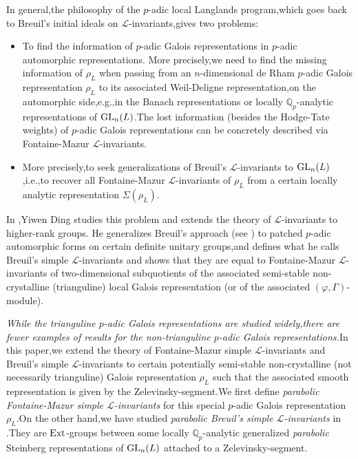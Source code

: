 \documentclass[SecEq,CM,GP]{degruyter-crelle} %
\theoremstyle{plain}
\newcommand{\ext}{{\rm Ext}}
\newcommand{\GLN}{{\rm GL}}
\newcommand{\BQ}{{\mathbb{Q}}}
\newcommand{\sL}{\mathcal L}
\begin{document}
In general,\;the philosophy of the $p$-adic local Langlands program,\;which goes back to Breuil's initial ideals on $\sL$-invariants,\;gives two problems:
\begin{itemize}
	\item[(I)] To find the information of $p$-adic Galois representations in $p$-adic automorphic representations. More precisely,\;we need to find the missing information  of $\rho_L$  when passing from an $n$-dimensional de Rham $p$-adic Galois representation $\rho_L$ to its associated Weil-Deligne representation,\;on the automorphic side,\;e.g.,\;in the Banach representations or locally ${\BQ}_p$-analytic  representations of $\GLN_n(L)$.\;The lost information (besides the Hodge-Tate weights) of $p$-adic Galois representations can be concretely described via  Fontaine-Mazur $\sL$-invariants.\;
	\item[(II)] More precisely,\;to seek generalizations of Breuil's $\sL$-invariants to $\GLN_n(L)$,\;i.e.,\;to recover all Fontaine-Mazur $\sL$-invariants of $\rho_L$ from a certain locally analytic representation $\Sigma(\rho_L)$.\;
\end{itemize}
In \cite{2019DINGSimple},\;Yiwen Ding studies this problem and extends the theory of 
$\sL$-invariants to higher-rank groups. He generalizes Breuil's approach (see \cite{BCLINV2}) to patched $p$-adic automorphic forms on certain definite unitary groups,\;and defines what he calls Breuil's simple $\sL$-invariants and shows that they are equal to Fontaine-Mazur $\sL$-invariants of two-dimensional subquotients of the associated semi-stable non-crystalline (trianguline) local Galois representation (or of the associated $(\varphi,\Gamma)$-module).\;

\textit{While the trianguline $p$-adic Galois representations are studied widely,\;there are fewer examples of results for the non-trianguline $p$-adic Galois representations.\;}In this paper,\;we extend the theory of {Fontaine-Mazur  simple $\sL$-invariants} and  {Breuil's simple $\sL$-invariants} to certain potentially semi-stable non-crystalline (not necessarily trianguline) Galois representation $\rho_L$ such that  the associated smooth representation is given by  the Zelevinsky-segment.\;We first define \textit{parabolic Fontaine-Mazur simple $\sL$-invariants} for this special $p$-adic Galois representation $\rho_L$.\;On the other hand,\;we have studied \textit{parabolic Breuil's simple $\sL$-invariants} in \cite{2022ext1hyq}.\;They are $\ext$-groups between some locally $\BQ_p$-analytic generalized \textit{parabolic} Steinberg representations of $\GLN_n(L)$ attached to a Zelevinsky-segment.\;
\end{document}
